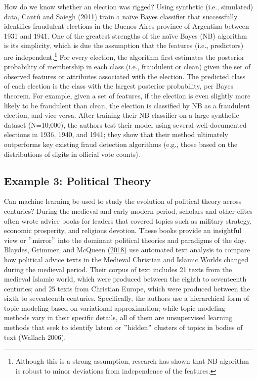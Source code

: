\documentclass{book}
\begin{document}
How do we know whether an election was rigged? Using synthetic (i.e.,
simulated) data, Cantú and Saiegh (\protect\hyperlink{ref-cant2011a}{2011})
train a naïve Bayes classifier that successfully identifies fraudulent
elections in the Buenos Aires province of Argentina between 1931 and 1941. One
of the greatest strengths of the naïve Bayes (NB) algorithm is its simplicity,
which is due the assumption that the features (i.e., predictors) are
independent.\footnote{Although this is a strong assumption, research has shown
  that NB algorithm is robust to minor deviations from independence of the
  features.} For every election, the algorithm first estimates the posterior
probability of membership in each class (i.e., fraudulent or clean) given the
set of observed features or attributes associated with the election. The
predicted class of each election is the class with the largest posterior
probability, per Bayes theorem. For example, given a set of features, if the
election is even slightly more likely to be fraudulent than clean, the
election is classified by NB as a fraudulent election, and vice versa. After
training their NB classifier on a large synthetic dataset (N=10,000), the
authors test their model using several well-documented elections in 1936,
1940, and 1941; they show that their method ultimately outperforms key
existing fraud detection algorithms (e.g., those based on the distributions of
digits in official vote counts).

\hypertarget{example-3-political-theory}{%
\subsection{Example 3: Political Theory}\label{example-3-political-theory}}

Can machine learning be used to study the evolution of political theory across
centuries? During the medieval and early modern period, scholars and other
elites often wrote advice books for leaders that covered topics such as
military strategy, economic prosperity, and religious devotion. These books
provide an insightful view or \("\)mirror\("\) into the dominant political
theories and paradigms of the day. Blaydes, Grimmer, and McQueen
(\protect\hyperlink{ref-blaydes2018a}{2018}) use automated text analysis to
compare how political advice texts in the Medieval Christian and Islamic
Worlds changed during the medieval period. Their corpus of text includes 21
texts from the medieval Islamic world, which were produced between the eighth
to seventeenth centuries; and 25 texts from Christian Europe, which were
produced between the sixth to seventeenth centuries. Specifically, the authors
use a hierarchical form of topic modeling based on variational approximation;
while topic modeling methods vary in their specific details, all of them are
unsupervised learning methods that seek to identify latent or \("\)hidden\("\)
clusters of topics in bodies of text (Wallach 2006).
\end{document}
